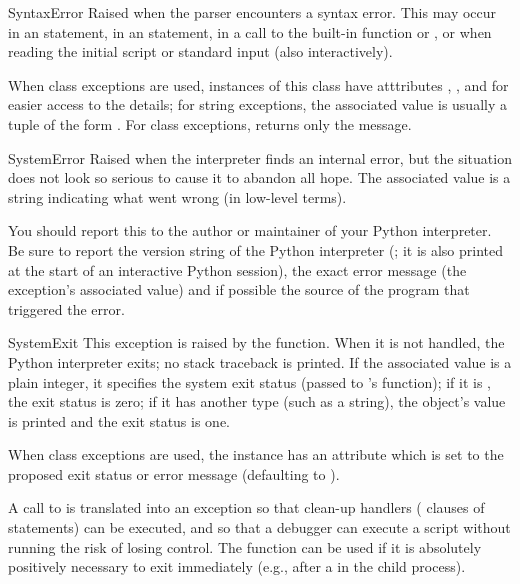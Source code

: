 \begin{excdesc}{SyntaxError}
  Raised when the parser encounters a syntax error.  This may occur in
  an  statement, in an  statement, in a call
  to the built-in function  or , or
  when reading the initial script or standard input (also
  interactively).

When class exceptions are used, instances of this class have
atttributes , ,  and
 for easier access to the details; for string exceptions,
the associated value is usually a tuple of the form
.
For class exceptions,  returns only the message.
\end{excdesc}

\begin{excdesc}{SystemError}
  Raised when the interpreter finds an internal error, but the
  situation does not look so serious to cause it to abandon all hope.
  The associated value is a string indicating what went wrong (in
  low-level terms).
  
  You should report this to the author or maintainer of your Python
  interpreter.  Be sure to report the version string of the Python
  interpreter (; it is also printed at the start of an
  interactive Python session), the exact error message (the exception's
  associated value) and if possible the source of the program that
  triggered the error.
\end{excdesc}

\begin{excdesc}{SystemExit}
  This exception is raised by the  function.  When it
  is not handled, the Python interpreter exits; no stack traceback is
  printed.  If the associated value is a plain integer, it specifies the
  system exit status (passed to \C{}'s  function); if it is
  , the exit status is zero; if it has another type (such as
  a string), the object's value is printed and the exit status is one.

When class exceptions are used, the instance has an attribute
 which is set to the proposed exit status or error message
(defaulting to ).
  
  A call to  is translated into an exception so that
  clean-up handlers ( clauses of  statements)
  can be executed, and so that a debugger can execute a script without
  running the risk of losing control.  The  function
  can be used if it is absolutely positively necessary to exit
  immediately (e.g., after a  in the child process).
\end{excdesc}


